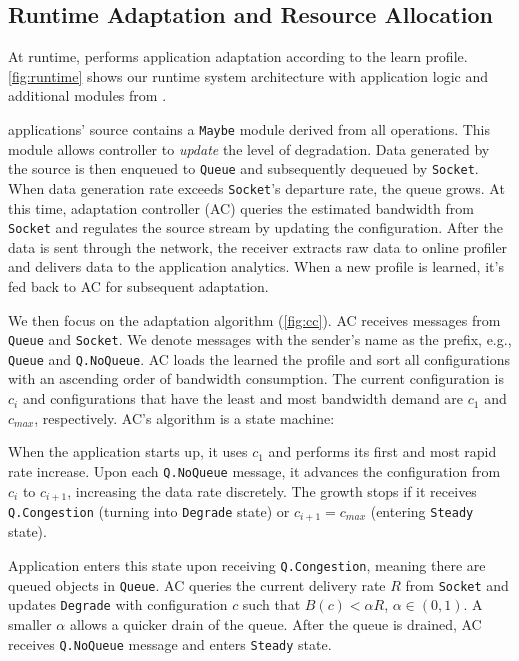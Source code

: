 \subsection{Runtime Adaptation and Resource Allocation}
\label{sec:runtime}

At runtime, \sysname{} performs application adaptation according to the learn
profile. \autoref{fig:runtime} shows our runtime system architecture with
application logic and additional modules from \sysname{}.

\sysname{} applications' source contains a \texttt{Maybe} module derived from
all \maybe{} operations. This module allows controller to \textit{update} the
level of degradation. Data generated by the source is then enqueued to
\texttt{Queue} and subsequently dequeued by \texttt{Socket}. When data
generation rate exceeds \texttt{Socket}'s departure rate, the queue grows. At
this time, adaptation controller (AC) queries the estimated bandwidth from
\texttt{Socket} and regulates the source stream by updating the configuration.
After the data is sent through the network, the receiver extracts raw data to
online profiler and delivers data to the application analytics.  When a new
profile is learned, it's fed back to AC for subsequent adaptation.

We then focus on the adaptation algorithm (\autoref{fig:cc}). AC receives
messages from \texttt{Queue} and \texttt{Socket}. We denote messages with the
sender's name as the prefix, e.g., \texttt{Queue} and \texttt{Q.NoQueue}. AC
loads the learned the profile and sort all configurations with an ascending
order of bandwidth consumption. The current configuration is $c_i$ and
configurations that have the least and most bandwidth demand are $c_1$ and
$c_{max}$, respectively. AC's algorithm is a state machine:

 When the application starts up, it uses $c_1$ and
performs its first and most rapid rate increase. Upon each \texttt{Q.NoQueue}
message, it advances the configuration from $c_i$ to $c_{i+1}$, increasing the
data rate discretely. The growth stops if it receives \texttt{Q.Congestion}
(turning into \texttt{Degrade} state) or $c_{i+1} = c_{max}$ (entering
\texttt{Steady} state).

 Application enters this state upon
receiving \texttt{Q.Congestion}, meaning there are queued objects in
\texttt{Queue}. AC queries the current delivery rate $R$ from \texttt{Socket}
and updates \texttt{Degrade} with configuration $c$ such that $B(c) < \alpha R$,
$\alpha \in (0, 1)$. A smaller $\alpha$ allows a quicker drain of the
queue. After the queue is drained, AC receives \texttt{Q.NoQueue} message and
enters \texttt{Steady} state.

